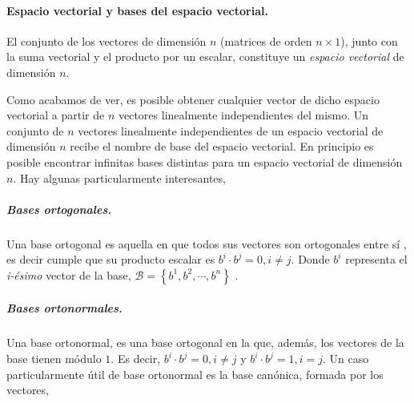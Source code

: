 \begin{paracol}{2}
\paragraph{Espacio vectorial y  bases del espacio vectorial.} El conjunto de los vectores de dimensión $n$ (matrices de orden $n\times 1$), junto con la suma vectorial y el producto por un escalar, constituye  un  \emph{espacio vectorial} de dimensión $n$.

 Como acabamos de ver, es posible obtener cualquier vector de dicho espacio vectorial a partir de $n$ vectores linealmente independientes del mismo. Un conjunto de $n$ vectores linealmente independientes de un espacio vectorial de dimensión $n$ recibe el nombre de base del espacio vectorial. En principio es posible encontrar infinitas bases distintas para un espacio vectorial de dimensión $n$. Hay algunas particularmente interesantes,
 
 \subparagraph{Bases ortogonales.} Una base ortogonal es aquella en que todos sus vectores son ortogonales entre sí , es decir cumple que su producto escalar es $b^i\cdot b^j=0, i\neq j$. Donde  $b^i$ representa el \emph{i-ésimo} vector de la base, $\mathcal{B}=\left\lbrace b^1, b^2, \cdots, b^n  \right\rbrace $ .
 
 \subparagraph{Bases ortonormales.} Una base ortonormal, es una base ortogonal en la que, además, los vectores de la base tienen módulo $1$. Es decir, $b^i\cdot b^j=0, i\neq j$ y  $b^i\cdot b^j=1, i = j$. Un caso particularmente útil de base ortonormal es la base canónica, formada por los vectores, 
\end{paracol}


